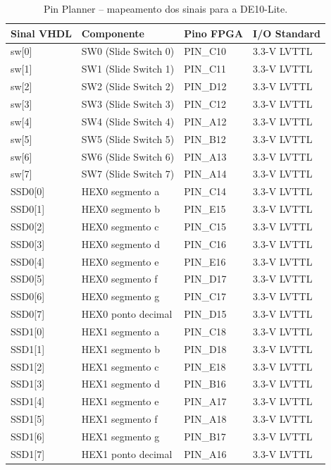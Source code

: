 \documentclass[12pt,a4paper, brazil]{article}
\begin{document}
\begin{table}[H]
\centering
\caption{Pin Planner -- mapeamento dos sinais para a DE10-Lite.}
\label{tab:pinplan}
\begin{tabular}{@{}llll@{}}
\toprule
\textbf{Sinal VHDL} & \textbf{Componente} & \textbf{Pino FPGA} & \textbf{I/O Standard} \\
\midrule
sw[0] & SW0 (Slide Switch 0) & PIN\_C10 & 3.3-V LVTTL \\
sw[1] & SW1 (Slide Switch 1) & PIN\_C11 & 3.3-V LVTTL \\
sw[2] & SW2 (Slide Switch 2) & PIN\_D12 & 3.3-V LVTTL \\
sw[3] & SW3 (Slide Switch 3) & PIN\_C12 & 3.3-V LVTTL \\
sw[4] & SW4 (Slide Switch 4) & PIN\_A12 & 3.3-V LVTTL \\
sw[5] & SW5 (Slide Switch 5) & PIN\_B12 & 3.3-V LVTTL \\
sw[6] & SW6 (Slide Switch 6) & PIN\_A13 & 3.3-V LVTTL \\
sw[7] & SW7 (Slide Switch 7) & PIN\_A14 & 3.3-V LVTTL \\
\midrule
SSD0[0] & HEX0 segmento a & PIN\_C14 & 3.3-V LVTTL \\
SSD0[1] & HEX0 segmento b & PIN\_E15 & 3.3-V LVTTL \\
SSD0[2] & HEX0 segmento c & PIN\_C15 & 3.3-V LVTTL \\
SSD0[3] & HEX0 segmento d & PIN\_C16 & 3.3-V LVTTL \\
SSD0[4] & HEX0 segmento e & PIN\_E16 & 3.3-V LVTTL \\
SSD0[5] & HEX0 segmento f & PIN\_D17 & 3.3-V LVTTL \\
SSD0[6] & HEX0 segmento g & PIN\_C17 & 3.3-V LVTTL \\
SSD0[7] & HEX0 ponto decimal & PIN\_D15 & 3.3-V LVTTL \\
\midrule
SSD1[0] & HEX1 segmento a & PIN\_C18 & 3.3-V LVTTL \\
SSD1[1] & HEX1 segmento b & PIN\_D18 & 3.3-V LVTTL \\
SSD1[2] & HEX1 segmento c & PIN\_E18 & 3.3-V LVTTL \\
SSD1[3] & HEX1 segmento d & PIN\_B16 & 3.3-V LVTTL \\
SSD1[4] & HEX1 segmento e & PIN\_A17 & 3.3-V LVTTL \\
SSD1[5] & HEX1 segmento f & PIN\_A18 & 3.3-V LVTTL \\
SSD1[6] & HEX1 segmento g & PIN\_B17 & 3.3-V LVTTL \\
SSD1[7] & HEX1 ponto decimal & PIN\_A16 & 3.3-V LVTTL \\
\bottomrule
\end{tabular}
\end{table}
\end{document}
